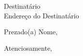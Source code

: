 \documentclass[a4paper,12pt]{letter}
\date{\today}
\begin{document}
\begin{letter}
    {Destinatário \\
    Endereço do Destinatário}

\opening{Prezado(a) Nome,}

\lipsum[1-3]

\closing{Atenciosamente,}

\end{letter}
\end{document}
